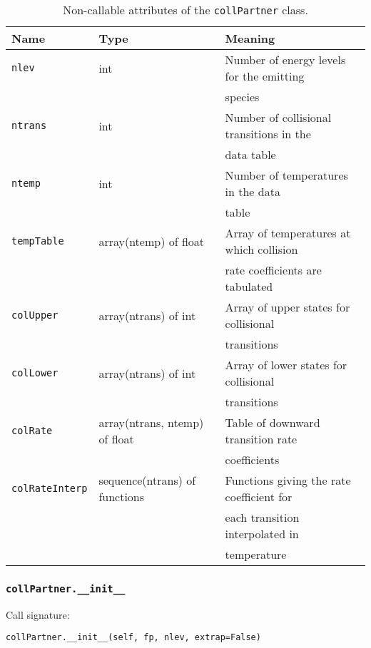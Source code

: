 \documentclass[12pt]{article}
\begin{document}
\begin{table}
\begin{center}
\begin{tabular}{lll}
\hline\hline
Name & Type & Meaning \\
\hline\hline
\texttt{nlev} & int & Number of energy levels for the emitting \\
& & \quad species \\
\texttt{ntrans} & int & Number of collisional transitions in the\\
& & \quad data table \\
\texttt{ntemp} & int & Number of temperatures in the data\\
& & \quad table\\
\texttt{tempTable} & array(ntemp) of float & Array of temperatures at which collision\\
& & \quad rate coefficients are tabulated \\
\texttt{colUpper} & array(ntrans) of int & Array of upper states for collisional \\
& & \quad transitions\\
\texttt{colLower} & array(ntrans) of int & Array of lower states for collisional\\
& & \quad transitions\\
\texttt{colRate} & array(ntrans, ntemp) of float & Table of downward transition rate \\
& & \quad coefficients\\
\texttt{colRateInterp} & sequence(ntrans) of functions & Functions giving the rate coefficient for \\
& & \quad each transition interpolated in \\
& & \quad temperature \\
\hline
\end{tabular}
\caption{
\label{tab:collPartner}
Non-callable attributes of the \texttt{collPartner} class.
}
\end{center}
\end{table}

\subsubsection{\texttt{collPartner.\_\_init\_\_}}

Call signature:

\begin{verbatim}
collPartner.__init__(self, fp, nlev, extrap=False)
\end{verbatim}
\end{document}
